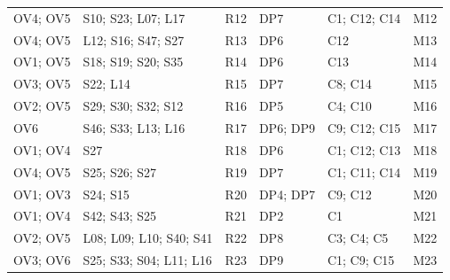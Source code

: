 \begin{longtable}{@{}P{.105\linewidth}P{.26\linewidth}P{.065\linewidth}P{.12\linewidth}P{.21\linewidth}P{.07\linewidth}@{}}
OV4;\allowbreak{} OV5 & S10;\allowbreak{} S23;\allowbreak{} L07;\allowbreak{} L17 & R12 & DP7 & C1;\allowbreak{} C12;\allowbreak{} C14 & M12 \\
OV4;\allowbreak{} OV5 & L12;\allowbreak{} S16;\allowbreak{} S47;\allowbreak{} S27 & R13 & DP6 & C12 & M13 \\
OV1;\allowbreak{} OV5 & S18;\allowbreak{} S19;\allowbreak{} S20;\allowbreak{} S35 & R14 & DP6 & C13 & M14 \\
OV3;\allowbreak{} OV5 & S22;\allowbreak{} L14 & R15 & DP7 & C8;\allowbreak{} C14 & M15 \\
OV2;\allowbreak{} OV5 & S29;\allowbreak{} S30;\allowbreak{} S32;\allowbreak{} S12 & R16 & DP5 & C4;\allowbreak{} C10 & M16 \\
OV6 & S46;\allowbreak{} S33;\allowbreak{} L13;\allowbreak{} L16 & R17 & DP6;\allowbreak{} DP9 & C9;\allowbreak{} C12;\allowbreak{} C15 & M17 \\
OV1;\allowbreak{} OV4 & S27 & R18 & DP6 & C1;\allowbreak{} C12;\allowbreak{} C13 & M18 \\
OV4;\allowbreak{} OV5 & S25;\allowbreak{} S26;\allowbreak{} S27 & R19 & DP7 & C1;\allowbreak{} C11;\allowbreak{} C14 & M19 \\
OV1;\allowbreak{} OV3 & S24;\allowbreak{} S15 & R20 & DP4;\allowbreak{} DP7 & C9;\allowbreak{} C12 & M20 \\
OV1;\allowbreak{} OV4 & S42;\allowbreak{} S43;\allowbreak{} S25 & R21 & DP2 & C1 & M21 \\
OV2;\allowbreak{} OV5 & L08;\allowbreak{} L09;\allowbreak{} L10;\allowbreak{} S40;\allowbreak{} S41 & R22 & DP8 & C3;\allowbreak{} C4;\allowbreak{} C5 & M22 \\
OV3;\allowbreak{} OV6 & S25;\allowbreak{} S33;\allowbreak{} S04;\allowbreak{} L11;\allowbreak{} L16 & R23 & DP9 & C1;\allowbreak{} C9;\allowbreak{} C15 & M23 \\
\bottomrule\end{longtable}